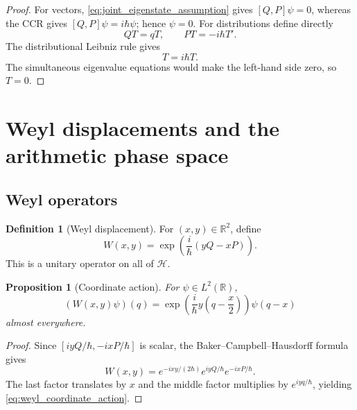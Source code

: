 \documentclass[11pt]{amsart}
\numberwithin{equation}{section}
\theoremstyle{plain}
\newtheorem{proposition}[theorem]{Proposition}
\theoremstyle{definition}
\newtheorem{definition}[theorem]{Definition}
\theoremstyle{remark}
\newcommand{\R}{\mathbb{R}}
\newcommand{\Hil}{\mathcal{H}}
\begin{document}
\begin{proof}
For vectors, \eqref{eq:joint_eigenstate_assumption} gives
\([Q,P]\psi=0\), whereas the CCR gives \([Q,P]\psi=i\hbar\psi\); hence
\(\psi=0\).  For distributions define directly
\begin{equation}
QT=qT,
\qquad
PT=-i\hbar T'.
\label{eq:distribution_QP_definition}
\end{equation}
The distributional Leibniz rule gives
\begin{equation}
[Q,P]T=i\hbar T.
\label{eq:distribution_CCR}
\end{equation}
The simultaneous eigenvalue equations would make the left-hand side zero,
so \(T=0\).
\end{proof}

\section{Weyl displacements and the arithmetic phase space}
\label{sec:weyl_arithmetic}

\subsection{Weyl operators}
\label{subsec:weyl_operators}

\begin{definition}[Weyl displacement]
\label{def:weyl_operator}
For $(x,y)\in\R^2$, define
\begin{equation}
W(x,y)
=
\exp\!\left(\frac{i}{\hbar}(yQ-xP)\right).
\label{eq:weyl_definition}
\end{equation}
This is a unitary operator on all of $\Hil$.
\end{definition}

\begin{proposition}[Coordinate action]
\label{prop:weyl_coordinate_action}
For $\psi\in L^2(\R)$,
\begin{equation}
(W(x,y)\psi)(q)
=
\exp\!\left(\frac{i}{\hbar}y\left(q-\frac{x}{2}\right)\right)
\psi(q-x)
\label{eq:weyl_coordinate_action}
\end{equation}
almost everywhere.
\end{proposition}

\begin{proof}
Since $[iyQ/\hbar,-ixP/\hbar]$ is scalar, the Baker--Campbell--Hausdorff
formula gives
\begin{equation}
W(x,y)
=
e^{-ixy/(2\hbar)}e^{iyQ/\hbar}e^{-ixP/\hbar}.
\label{eq:weyl_BCH_factorization}
\end{equation}
The last factor translates by $x$ and the middle factor multiplies by
$e^{iyq/\hbar}$, yielding \eqref{eq:weyl_coordinate_action}.
\end{proof}
\end{document}
